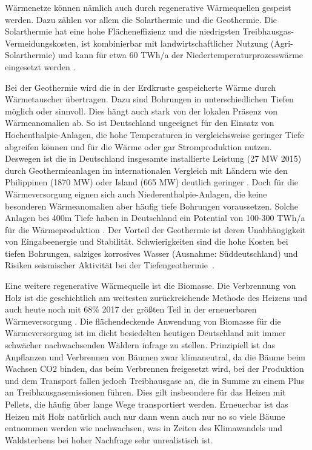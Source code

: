 Wärmenetze können nämlich auch durch regenerative Wärmequellen gespeist werden.
Dazu zählen vor allem die Solarthermie und die Geothermie. Die Solarthermie hat eine hohe Flächeneffizienz und die niedrigsten Treibhausgas-Vermeidungskosten, ist kombinierbar mit landwirtschaftlicher Nutzung (Agri-Solarthermie) und kann für etwa 60 TWh/a der Niedertemperaturprozesswärme eingesetzt werden \cite{clausen2022}. 

Bei der Geothermie wird die in der Erdkruste gespeicherte Wärme durch Wärmetauscher übertragen. Dazu sind Bohrungen in unterschiedlichen Tiefen möglich oder sinnvoll. Dies hängt auch stark von der lokalen Präsenz von Wärmeanomalien ab. So ist Deutschland ungeeignet für den Einsatz von Hochenthalpie-Anlagen, die hohe Temperaturen in vergleichsweise geringer Tiefe abgreifen können und für die Wärme oder gar Stromproduktion nutzen. Deswegen ist die in Deutschland insgesamte installierte Leistung (27 MW 2015) durch Geothermieanlagen im internationalen Vergleich mit Ländern wie den Philippinen (1870 MW) oder Island (665 MW) deutlich geringer \cite{ei1}. Doch für die Wärmeversorgung eignen sich auch Niederenthalpie-Anlagen, die keine besonderen Wärmeanomalien aber häufig tiefe Bohrungen voraussetzen. Solche Anlagen bei 400m Tiefe haben in Deutschland ein Potential von 100-300 TWh/a für die Wärmeproduktion \cite{clausen2022}.
Der Vorteil der Geothermie ist deren Unabhängigkeit von Eingabeenergie und Stabilität. Schwierigkeiten sind die hohe Kosten bei tiefen Bohrungen, salziges korrosives Wasser (Ausnahme: Süddeutschland) und Risiken seismischer Aktivität bei der Tiefengeothermie~\cite{ei1}.

Eine weitere regenerative Wärmequelle ist die Biomasse. Die Verbrennung von Holz ist die geschichtlich am weitesten zurückreichende Methode des Heizens und auch heute noch mit 68\% 2017 der größten Teil in der erneuerbaren Wärmeversorgung \cite{ei1}. Die flächendeckende Anwendung von Biomasse für die Wärmeversorgung ist im dicht besiedelten heutigen Deutschland mit immer schwächer nachwachsenden Wäldern infrage zu stellen. Prinzipiell ist das Anpflanzen und Verbrennen von Bäumen zwar klimaneutral, da die Bäume beim Wachsen CO2 binden, das beim Verbrennen freigesetzt wird, bei der Produktion und dem Transport fallen jedoch Treibhausgase an, die in Summe zu einem Plus an Treibhausgasemissionen führen.
Dies gilt insbeondere für das Heizen mit Pellets, die häufig über lange Wege transportiert werden.
Erneuerbar ist das Heizen mit Holz natürlich auch nur dann wenn auch nur no so viele Bäume entnommen werden wie nachwachsen, was in Zeiten des Klimawandels und Waldsterbens bei hoher Nachfrage sehr unrealistisch ist.

